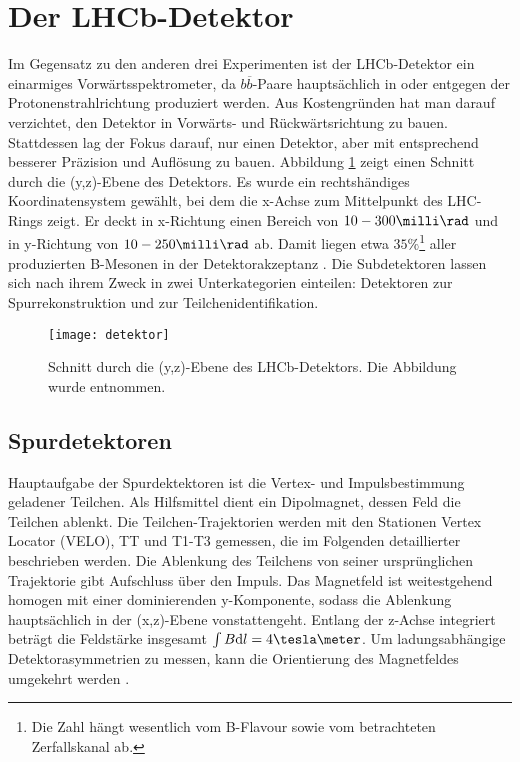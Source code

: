 \section{Der LHCb-Detektor}
Im Gegensatz zu den anderen drei Experimenten ist der LHCb-Detektor ein einarmiges Vorwärtsspektrometer, da $b\overline{b}$-Paare hauptsächlich in oder entgegen der Protonenstrahlrichtung produziert werden. Aus Kostengründen hat man darauf verzichtet, den Detektor in Vorwärts- und Rückwärtsrichtung zu bauen. Stattdessen lag der Fokus darauf, nur einen Detektor, aber mit entsprechend besserer Präzision und Auflösung zu bauen.  Abbildung \ref{fig:detektor} zeigt einen Schnitt durch die (y,z)-Ebene des Detektors. Es wurde ein rechtshändiges Koordinatensystem gewählt, bei dem die x-Achse zum Mittelpunkt des LHC-Rings zeigt. Er deckt in x-Richtung einen Bereich von $10-300\milli\rad$ und in y-Richtung von $10-250\milli\rad$ ab. Damit liegen etwa $35\%$\footnote{Die Zahl hängt wesentlich vom B-Flavour sowie vom betrachteten Zerfallskanal ab.} aller produzierten B-Mesonen in der Detektorakzeptanz \cite{detektorakzeptanz}. Die Subdetektoren lassen sich nach ihrem Zweck in zwei Unterkategorien einteilen: Detektoren zur Spurrekonstruktion und zur Teilchenidentifikation.

\begin{figure}[hptb]
\centering
\texttt{[image: detektor]}
\caption{Schnitt durch die (y,z)-Ebene des LHCb-Detektors. Die Abbildung wurde \cite{detector} entnommen.}
\label{fig:detektor}
\end{figure}


\subsection{Spurdetektoren}
Hauptaufgabe der Spurdektektoren ist die Vertex- und Impulsbestimmung geladener Teilchen. Als Hilfsmittel dient ein Dipolmagnet, dessen Feld die Teilchen ablenkt. Die Teilchen-Trajektorien werden mit den Stationen Vertex Locator (VELO), TT und T1-T3 gemessen, die im Folgenden detaillierter beschrieben werden. Die Ablenkung des Teilchens von seiner ursprünglichen Trajektorie gibt Aufschluss über den Impuls. Das Magnetfeld ist weitestgehend homogen mit einer dominierenden y-Komponente, sodass die Ablenkung hauptsächlich in der (x,z)-Ebene vonstattengeht. Entlang der z-Achse integriert beträgt die Feldstärke insgesamt $\int B\mathrm{d}l = 4\tesla\meter$. Um ladungsabhängige Detektorasymmetrien zu messen, kann die Orientierung des Magnetfeldes umgekehrt werden \cite{thesis_linn}.

